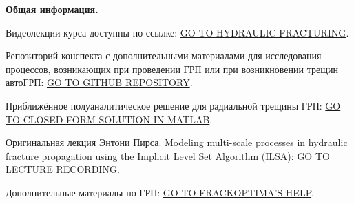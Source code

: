 \documentclass[main.tex]{subfiles}
\begin{document}
\textbf{Общая информация.}

Видеолекции курса доступны по ссылке: \href{https://youtube.com/playlist?list=PLipUmK_65GXEpFTHhfJBaiiv7XiwMg-PM}{GO TO HYDRAULIC FRACTURING}.

Репозиторий конспекта с дополнительными материалами для исследования процессов, возникающих при проведении ГРП или при возникновении трещин автоГРП: \href{https://github.com/mualal/hydrofracturing}{GO TO GITHUB REPOSITORY}.

Приближённое полуаналитическое решение для радиальной трещины ГРП: \href{https://datadryad.org/stash/dataset/doi:10.5061/dryad.gh469}{GO TO CLOSED-FORM SOLUTION IN MATLAB}.

Оригинальная лекция Энтони Пирса. Modeling multi-scale processes in hydraulic fracture propagation using the Implicit Level Set Algorithm (ILSA): \href{https://www.youtube.com/watch?v=PXfy5f9kWh4}{GO TO LECTURE RECORDING}.

Дополнительные материалы по ГРП: \href{http://www.frackoptima.com/userguide/index.html}{GO TO FRACKOPTIMA'S HELP}.
\end{document}
